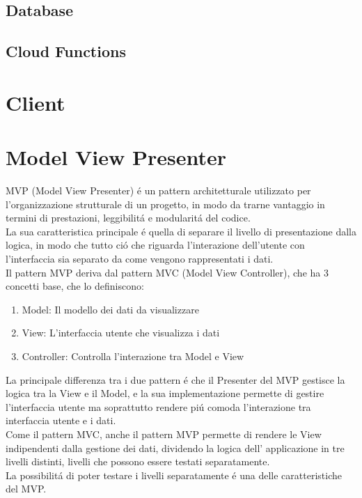 \subsection{Database}

\subsection{Cloud Functions}

\section{Client}                 %



\section{Model View Presenter}                 %
MVP (Model View Presenter) \'e un pattern architetturale utilizzato per l'organizzazione strutturale di un progetto, in modo da trarne vantaggio in termini di prestazioni, leggibilit\'a e modularit\'a del codice.\\
La sua caratteristica principale \'e quella di separare il livello di presentazione dalla logica, in modo che tutto ci\'o che riguarda l'interazione dell'utente con l'interfaccia sia separato da come vengono rappresentati i dati.\\
Il pattern MVP deriva dal pattern MVC (Model View Controller), che ha 3 concetti base, che lo definiscono:

\begin{enumerate}
\item Model: Il modello dei dati da visualizzare
\item View: L'interfaccia utente che visualizza i dati
\item Controller: Controlla l'interazione tra Model e View
\end{enumerate}

La principale differenza tra i due pattern \'e che il Presenter del MVP gestisce la logica tra la View e il Model, e la sua implementazione permette di gestire l'interfaccia utente ma soprattutto rendere pi\'u comoda l'interazione tra interfaccia utente e i dati.\\


Come il pattern MVC, anche il pattern MVP permette di rendere le View indipendenti dalla gestione dei dati, dividendo la logica dell' applicazione in tre livelli distinti, livelli che possono essere testati separatamente.\\
La possibilit\'a di poter testare i livelli separatamente \'e una delle caratteristiche del MVP.\@


